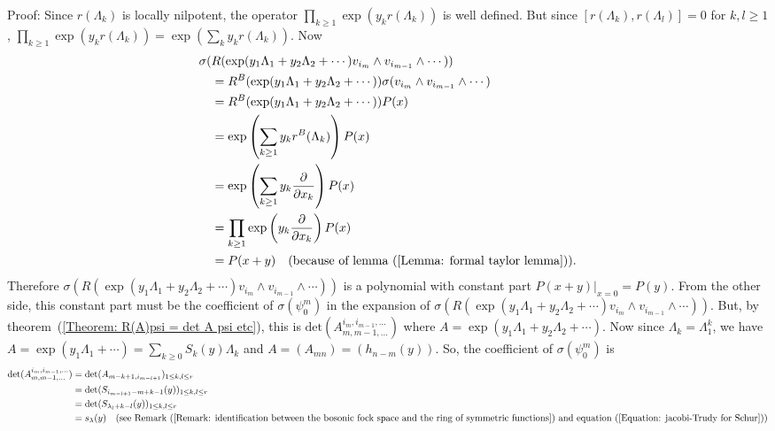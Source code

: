 Proof: Since $r(\Lambda_k)$ is locally nilpotent, the operator $\prod_{k\geq 1}\exp(y_kr(\Lambda_k))$ is well defined. But since $[r(\Lambda_k),r(\Lambda_l)]=0$ for $k,l\geq 1$, $\prod_{k\geq 1}\exp(y_kr(\Lambda_k))=\exp(\sum_{k}y_kr(\Lambda_k))$. Now
\begin{equation}
    \begin{split}
        &\sigma(R(\exp(y_1\Lambda_1+y_2\Lambda_2+\cdots)v_{i_m}\wedge v_{i_{m-1}}\wedge \cdots))\\
        &\quad =R^B(\exp(y_1\Lambda_1+y_2\Lambda_2+\cdots))\sigma(v_{i_m}\wedge v_{i_{m-1}}\wedge\cdots)\\
        &\quad =R^B(\exp(y_1\Lambda_1+y_2\Lambda_2+\cdots))P(x)\\
        &\quad =\exp\left(\sum_{k\geq1}y_kr^B(\Lambda_k)\right)P(x)\\
         &\quad =\exp\left(\sum_{k\geq 1}y_k\frac{\partial}{\partial x_k}\right)P(x)\\
          &\quad =\prod_{k\geq1}\exp\left(y_k\frac{\partial}{\partial x_k}\right)P(x)\\
         &\quad =P(x+y)\quad (\text{because of lemma~(\ref{Lemma: formal taylor lemma})}).
    \end{split}
\end{equation}
Therefore $\sigma(R(\exp(y_1\Lambda_1+y_2\Lambda_2+\cdots)v_{i_m}\wedge v_{i_{m-1}}\wedge \cdots))$ is a polynomial with constant part $P(x+y)\bigl|_{x=0}=P(y)$. From the other side, this constant part must be the coefficient of $\sigma(\psi_0^m)$ in the expansion of $\sigma(R(\exp(y_1\Lambda_1+y_2\Lambda_2+\cdots)v_{i_m}\wedge v_{i_{m-1}}\wedge \cdots))$. But, by theorem~(\ref{Theorem: R(A)psi = det A psi etc}), this is $\text{det}(A_{m,m-1,\dots}^{i_m,i_{m-1},\dots})$ where $A=\exp(y_1\Lambda_1+y_2\Lambda_2+\cdots)$. Now since $\Lambda_k=\Lambda_1^k$, we have $A=\exp(y_1\Lambda_1+\cdots)=\sum_{k\geq0}S_k(y)\Lambda_k$ and $A=(A_{mn})=(h_{n-m}(y))$. So, the coefficient of $\sigma(\psi_0^m)$ is
\begin{equation}
    \begin{split}
        \text{det}(A_{m,m-1,\dots}^{i_m,i_{m-1},\dots}) &= \text{det}(A_{m-k+1,i_{m-l+1}})_{1\leq k,l\leq r}\\
        &= \text{det}(S_{i_{m-l+1}-m+k-1}(y))_{1\leq k,l\leq r}\\
        &=\text{det}(S_{\lambda_l +k-l}(y))_{1\leq k,l\leq r}\\
        &=s_\lambda(y)\quad(\text{see Remark~(\ref{Remark: identification between the bosonic fock space and the ring of symmetric functions}) and equation~(\ref{Equation: jacobi-Trudy for Schur})})
    \end{split}
\end{equation}

